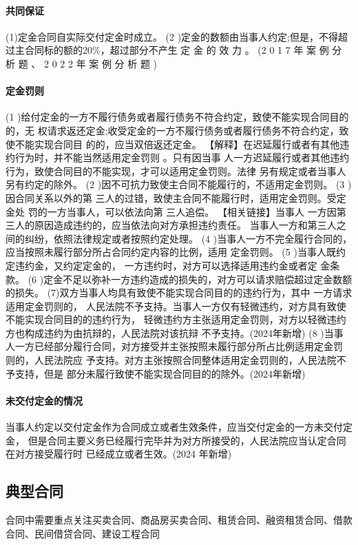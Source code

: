 \documentclass[UTF8,12pt]{ctexart}
\numberwithin{equation}{section} %
\numberwithin{figure}{section}
\numberwithin{table}{section}
\begin{document}
	\paragraph{共同保证}
	(1)定金合同自实际交付定金时成立。
	(2 )定金的数额由当事人约定;但是，不得超过主合同标的额的20\%，超过部分不产生 定 金 的 效 力 。 (2 0 1 7 年 案 例 分 析 题 、 2 0 2 2 年 案 例 分 析 题 )
	
	
	\paragraph{定金罚则}
	(1 )给付定金的一方不履行债务或者履行债务不符合约定，致使不能实现合同目的的，无 权请求返还定金;收受定金的一方不履行债务或者履行债务不符合约定，致使不能实现合同目 的的，应当双倍返还定金。
	【解释】在迟延履行或者有其他违约行为时，并不能当然适用定金罚则 。只有因当事 人一方迟延履行或者其他违约行为，致使合同目的不能实现，才可以适用定金罚则。法律 另有规定或者当事人另有约定的除外。
	(2 )因不可抗力致使主合同不能履行的，不适用定金罚则。
	(3 )因合同关系以外的第 三人的过错，致使主合同不能履行时，适用定金罚则。受定金处 罚的一方当事人，可以依法向第 三人追偿。
	【相关链接】当事人 一方因第三人的原因造成违约的，应当依法向对方承担违约责任。 当事人一方和第三人之间的纠纷，依照法律规定或者按照约定处理。
	(4 )当事人一方不完全履行合同的，应当按照未履行部分所占合同约定内容的比例，适用 定金罚则。
	(5 )当事人既约定违约金，又约定定金的， 一方违约时，对方可以选择适用违约金或者定 金条款。
	(6 )定金不足以弥补一方违约造成的损失的，对方可以请求赔偿超过定金数额的损失。
	(7)双方当事人均具有致使不能实现合同目的的违约行为，其中 一方请求适用定金罚则的， 人民法院不予支持。当事人一方仅有轻微违约，对方具有致使不能实现合同目的的违约行为， 轻微违约方主张适用定金罚则，对方以轻微违约方也构成违约为由抗辩的，人民法院对该抗辩
	不予支持。(2024年新增)
	(8 )当事人一方已经部分履行合同，对方接受并主张按照未履行部分所占比例适用定金罚
	则的，人民法院应 予支持。对方主张按照合同整体适用定金罚则的，人民法院不予支持，但是 部分未履行致使不能实现合同目的的除外。(2024年新增)
	
	\paragraph{未交付定金的情况}当事人约定以交付定金作为合同成立或者生效条件，应当交付定金的一方未交付定金， 但是合同主要义务已经履行完毕并为对方所接受的，人民法院应当认定合同在对方接受履行时 已经成立或者生效。(2024 年新增)
	
	\subsection{典型合同}
	合同中需要重点关注买卖合同、商品房买卖合同、租赁合同、融资租赁合同、借款合同、民间借贷合同、建设工程合同
	
\end{document}
